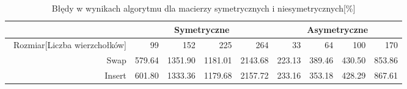 \begin{table}
\begin{tabular}{|r|r|r|r|r|r|r|r|r|}
\hline
 & \multicolumn{4}{|c|}{Symetryczne} & \multicolumn{4}{|c|}{Asymetryczne} \\ \hline\
Rozmiar[Liczba wierzchołków] & 99 & 152 & 225 & 264 & 33 & 64 & 100 & 170 \\ \hline
Swap & 579.64 & 1351.90 & 1181.01 & 2143.68 & 223.13 & 389.46 & 430.50 & 853.86 \\
Insert & 601.80 & 1333.36 & 1179.68 & 2157.72 & 233.16 & 353.18 & 428.29 & 867.61 \\ \hline
\end{tabular}
\caption{Błędy w wynikach algorytmu dla macierzy symetrycznych i niesymetrycznych[\%]}
\label{tab:error_AnStartVal}
\end{table}
